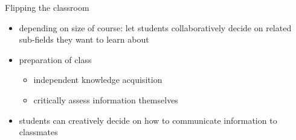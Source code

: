 %
%	



\begin{frame}{Flipping the classroom}
\begin{itemize}
	\item depending on size of course: let students \alert{collaboratively} decide on related sub-fields they want to learn about
	\item preparation of class
	\begin{itemize}
		\item independent \alert{knowledge acquisition}
		\item \alert{critically} assess information themselves
	\end{itemize}
	\item students can \alert{creatively} decide on how to \alert{communicate} information to classmates
\end{itemize}
\end{frame}


